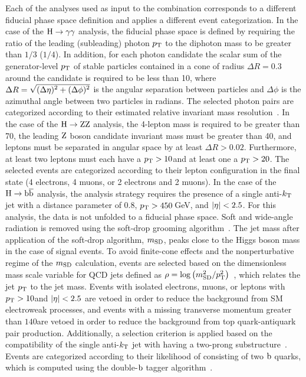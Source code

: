 Each of the analyses used as input to the combination corresponds to a different fiducial phase space definition and applies a different event categorization.
In the case of the $\mathrm{H}\to\mathrm{\gamma}\mathrm{\gamma}$ analysis, the fiducial phase space is defined by requiring the ratio of the leading (subleading) photon $p_\mathrm{T}$ to the diphoton mass to be greater than $1/3$ ($1/4$).
In addition, for each photon candidate the scalar sum of the generator-level $p_\mathrm{T}$ of stable particles contained in a cone of radius $\Delta R=0.3$ around the candidate is required to be less than 10\GeV, where $\Delta R = \sqrt{\smash[b]{(\Delta\eta)^2+(\Delta\phi)^2}}$ is the angular separation between particles and $\Delta\phi$ is the azimuthal angle between two particles in radians.
The selected photon pairs are categorized according to their estimated relative invariant mass resolution~\cite{Sirunyan:2018kta}.
In the case of the $\mathrm{H}\to\mathrm{Z}\mathrm{Z}$ analysis, the 4-lepton mass is required to be greater than 70\GeV, the leading $\mathrm{Z}$ boson candidate invariant mass must be greater than 40\GeV, and leptons must be separated in angular space by at least $\Delta R > 0.02$.
Furthermore, at least two leptons must each have a $p_\mathrm{T}>10$\GeV and at least one a $p_\mathrm{T} > 20$\GeV.
The selected events are categorized according to their lepton configuration in the final state (4 electrons, 4 muons, or 2 electrons and 2 muons).
In the case of the $\mathrm{H}\to\mathrm{b}\overline{\mathrm{b}}$ analysis, the analysis strategy requires the presence of a single anti-$k_\mathrm{T}$ jet with a distance parameter of $0.8$, $p_\mathrm{T}>450\,$GeV, and $\left| \eta \right |<2.5$.
For this analysis, the data is not unfolded to a fiducial phase space.
Soft and wide-angle radiation is removed using the soft-drop grooming algorithm~\cite{Dasgupta:2013ihk,Larkoski:2014wba}.
The jet mass after application of the soft-drop algorithm, $m_\mathrm{SD}$, peaks close to the Higgs boson mass in the case of signal events.
To avoid finite-cone effects and the nonperturbative regime of the $m_\mathrm{SD}$ calculation, events are selected based on the dimensionless mass scale variable for QCD jets defined as $\rho=\log\left(m_\mathrm{SD}^2/p_\mathrm{T}^2\right)$~\cite{Dasgupta:2013ihk}, which relates the jet $p_\mathrm{T}$ to the jet mass.
Events with isolated electrons, muons, or \taulepton leptons with $p_\mathrm{T}>10$\GeV and $\left| \eta \right |<2.5$ are vetoed in order to reduce the background from SM electroweak processes, and events with a missing transverse momentum greater than $140$\GeV are vetoed in order to reduce the background from top quark-antiquark pair production.
Additionally, a selection criterion is applied based on the compatibility of the single anti-$k_\mathrm{T}$ jet with having a two-prong substructure~\cite{Dolen:2016kst,Moult:2016cvt,Larkoski:2013eya,Thaler:2010tr}.
Events are categorized according to their likelihood of consisting of two $\mathrm{b}$ quarks, which is computed using the double-$\mathrm{b}$ tagger algorithm~\cite{Sirunyan:2017ezt}.



